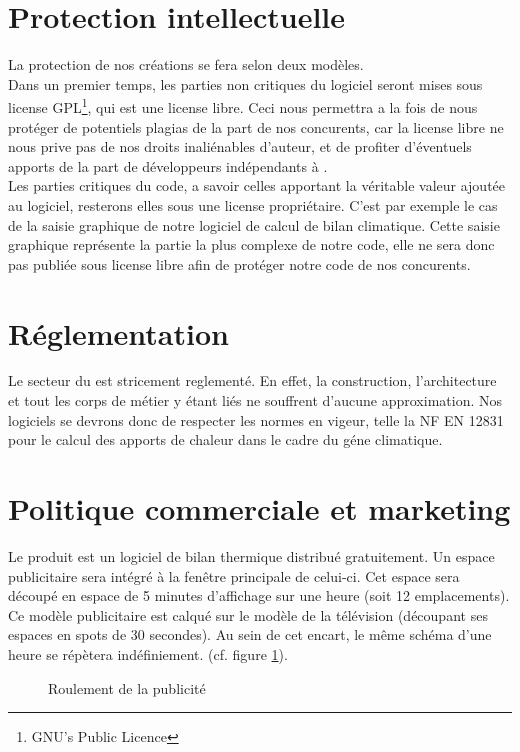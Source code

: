 \section{Protection intellectuelle}
  La protection de nos créations se fera selon deux modèles.\\
  Dans un premier temps, les parties non critiques du logiciel seront mises sous license GPL\footnote{GNU's Public Licence}, qui est une license libre. Ceci nous permettra a la fois de nous protéger de potentiels plagias de la part de nos concurents, car la license libre ne nous prive pas de nos droits inaliénables d'auteur, et de profiter d'éventuels apports de la part de développeurs indépendants à \K{}.\\
  Les parties critiques du code, a savoir celles apportant la véritable valeur ajoutée au logiciel,
  resterons elles sous une license propriétaire.
  C'est par exemple le cas de la saisie graphique de notre logiciel de calcul de bilan climatique.
  Cette saisie graphique représente la partie la plus complexe de notre code,
  elle ne sera donc pas publiée sous license libre afin de protéger notre code de nos concurents.
\section{Réglementation}
  Le secteur du \gHabitat{} est stricement reglementé. En effet, la construction, l'architecture et tout les corps de métier y étant liés ne souffrent d'aucune approximation.
  Nos logiciels se devrons donc de respecter les normes en vigeur, telle la NF EN 12831 pour le calcul des apports de chaleur dans le cadre du géne climatique.
\section{Politique commerciale et marketing}
  Le produit est un logiciel de bilan thermique
  distribué gratuitement. Un espace publicitaire
  sera intégré à la fenêtre principale de celui-ci.
  Cet espace sera découpé en espace de 5 minutes
  d'affichage sur une heure (soit 12 emplacements).
  Ce modèle publicitaire est calqué sur le modèle
  de la télévision (découpant ses espaces en spots
  de 30 secondes). Au sein de cet encart, le même
  schéma d'une heure se répètera indéfiniement.
  (cf. figure \ref{fig:roulementPub}).\\ 
  \begin{figure}[h]
	  \begin{center}
		
	  \end{center}
	  \caption{Roulement de la publicité}
	  \label{fig:roulementPub}
  \end{figure}

